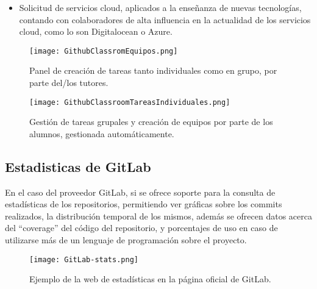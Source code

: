 \begin{itemize}
\begin{itemize}
    los alumnos entregan la tarea, siguiendo las indicaciones asignadas a
    la tarea, esta se autoevalúan, teniendo acceso en tiempo real de parte
    de los alumnos de las calificaciones y haciendo más eficiente el
    trabajo del profesor (Figura~\ref{figure:GitHubClassroomTareas})
  \item Control total de los repositorios creados sobre el aula de trabajo,
    permitiendo tanto comunicación con los alumnos, como un amplio catálogo
    de estadísticas y herramientas para la evaluación. Permite también la
    evaluación y corrección de los repositorios de los alumnos de forma
    rápida y sencilla, pudiendo realizar comentarios sobre los commits
    creados y teniendo interacción con los alumnos.
  \end{itemize}
\item Solicitud de servicios cloud, aplicados a la enseñanza de nuevas
  tecnologías, contando con colaboradores de alta influencia en la
  actualidad de los servicios cloud, como lo son Digitalocean o Azure.
\end{itemize}

\begin{figure}[h!]
  \texttt{[image: GithubClassromEquipos.png]}
  \caption{Panel de creación de tareas tanto individuales como en grupo,
    por parte del/los tutores.}
  \label{figure:GitHubClassroomTareas}
\end{figure}
\begin{figure}[h!]
  \texttt{[image: GithubClassroomTareasIndividuales.png]}
  \caption{Gestión de tareas grupales y creación de equipos por parte de
    los alumnos, gestionada automáticamente.}
  \label{figure:GitHubClassroomEquipos}
\end{figure}


\subsection{Estadisticas de GitLab}

En el caso del proveedor GitLab, si se ofrece soporte para la consulta de
estadísticas de los repositorios, permitiendo ver gráficas sobre los
commits realizados, la distribución temporal de los mismos, además se
ofrecen datos acerca del ``coverage'' del código del repositorio, y
porcentajes de uso en caso de utilizarse más de un lenguaje de programación
sobre el proyecto.

\begin{figure}[h!]
  \texttt{[image: GitLab-stats.png]}
  \caption{Ejemplo de la web de estadísticas en la página oficial de
    GitLab.}
  \label{figure:GitLabInsights}
\end{figure}

